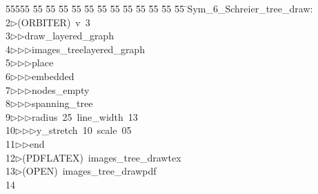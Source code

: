 %
%
\begin{tabbing}
55555 \= 55 \= 55 \= 55 \= 55 \= 55 \= 55 \= 55 \= 55 \= 55 \= 55 \= 55 \= 55 \= \>Sym\_6\_Schreier\_tree\_draw:\\[0pt]
2\>$\triangleright$\>(ORBITER)\ v\ 3\ \\[0pt]
3\>$\triangleright$\>$\triangleright$\>draw\_layered\_graph\ \\[0pt]
4\>$\triangleright$\>$\triangleright$\>$\triangleright$\>images\_treelayered\_graph\ \\[0pt]
5\>$\triangleright$\>$\triangleright$\>$\triangleright$\>place\ \\[0pt]
6\>$\triangleright$\>$\triangleright$\>$\triangleright$\>embedded\ \\[0pt]
7\>$\triangleright$\>$\triangleright$\>$\triangleright$\>nodes\_empty\ \\[0pt]
8\>$\triangleright$\>$\triangleright$\>$\triangleright$\>spanning\_tree\ \\[0pt]
9\>$\triangleright$\>$\triangleright$\>$\triangleright$\>radius\ 25\ line\_width\ 13\ \\[0pt]
10\>$\triangleright$\>$\triangleright$\>$\triangleright$\>y\_stretch\ 10\ scale\ 05\ \\[0pt]
11\>$\triangleright$\>$\triangleright$\>end\\[0pt]
12\>$\triangleright$\>(PDFLATEX)\ images\_tree\_drawtex\\[0pt]
13\>$\triangleright$\>(OPEN)\ images\_tree\_drawpdf\\[0pt]
14\>\end{tabbing}
